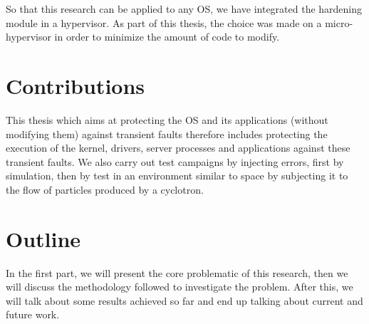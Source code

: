So that this research can be applied to any OS, we have integrated the hardening module in a hypervisor. As part of this thesis, the choice was made on a micro-hypervisor in order to minimize the amount of code to modify.

\section{Contributions}
This thesis which aims at protecting the OS and its applications (without modifying them) against transient faults therefore includes protecting the execution of the kernel, drivers, server processes and applications against these transient faults. We also carry out test campaigns by injecting errors, first by simulation, then by test in an environment similar to space by subjecting it to the flow of particles produced by a cyclotron. 

\section{Outline}
In the first part, we will present the core problematic of this research, then we will discuss the methodology followed to investigate the problem. After this, we will talk about some results achieved so far and end up talking about current and future work.



